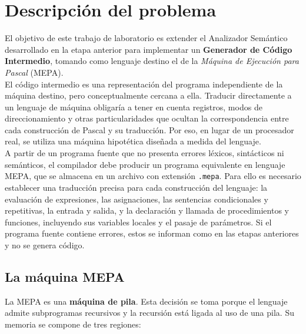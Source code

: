 \documentclass[12pt]{article}
\begin{document}
\pagebreak

\tableofcontents

\pagebreak


\section{Descripción del problema}

El objetivo de este trabajo de laboratorio es extender el Analizador Semántico desarrollado en la etapa anterior para implementar un \textbf{Generador de Código Intermedio}, tomando como lenguaje destino el de la \textit{Máquina de Ejecución para Pascal} (MEPA). \\

El código intermedio es una representación del programa independiente de la máquina destino, pero conceptualmente cercana a ella. Traducir directamente a un lenguaje de máquina obligaría a tener en cuenta registros, modos de direccionamiento y otras particularidades que ocultan la correspondencia entre cada construcción de Pascal y su traducción. Por eso, en lugar de un procesador real, se utiliza una máquina hipotética diseñada a medida del lenguaje. \\

A partir de un programa fuente que no presenta errores léxicos, sintácticos ni semánticos, el compilador debe producir un programa equivalente en lenguaje MEPA, que se almacena en un archivo con extensión \texttt{.mepa}. Para ello es necesario establecer una traducción precisa para cada construcción del lenguaje: la evaluación de expresiones, las asignaciones, las sentencias condicionales y repetitivas, la entrada y salida, y la declaración y llamada de procedimientos y funciones, incluyendo sus variables locales y el pasaje de parámetros. Si el programa fuente contiene errores, estos se informan como en las etapas anteriores y no se genera código.

\subsection{La máquina MEPA}

La MEPA es una \textbf{máquina de pila}. Esta decisión se toma porque el lenguaje admite subprogramas recursivos y la recursión está ligada al uso de una pila. Su memoria se compone de tres regiones:
\end{document}

